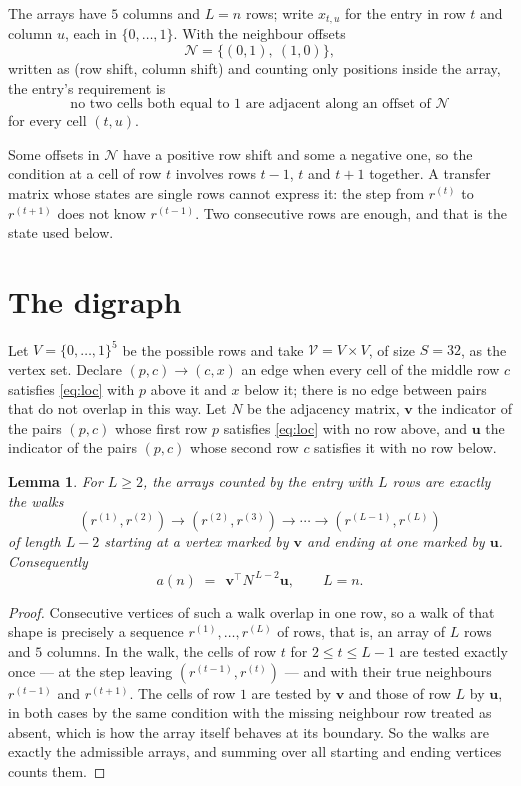 \documentclass[11pt,a4paper]{article}
\theoremstyle{plain}
\newtheorem{lemma}[theorem]{Lemma}
\theoremstyle{definition}
\begin{document}
The arrays have $5$ columns and $L=n$ rows; write $x_{t,u}$ for the entry in
row $t$ and column $u$, each in $\{0,\dots,1\}$. With the neighbour offsets
\[
\mathcal N=\{(0,1),\ (1,0)\},
\]
written as (row shift, column shift) and counting only positions inside the array, the
entry's requirement is
\begin{equation}\label{eq:loc}
\text{no two cells both equal to }1\text{ are adjacent along an offset of }\mathcal N
\end{equation}
for every cell $(t,u)$.

Some offsets in $\mathcal N$ have a positive row shift and some a negative one, so the
condition at a cell of row $t$ involves rows $t-1$, $t$ and $t+1$ together. A transfer
matrix whose states are single rows cannot express it: the step from $r^{(t)}$ to
$r^{(t+1)}$ does not know $r^{(t-1)}$. Two consecutive rows are enough, and that is
the state used below.

\section{The digraph}

Let $V=\{0,\dots,1\}^{5}$ be the possible rows and take
$\mathcal V=V\times V$, of size $S=32$, as the vertex set. Declare $(p,c)\to(c,x)$ an edge
when every cell of the middle row $c$ satisfies \eqref{eq:loc} with $p$ above it and $x$
below it; there is no edge between pairs that do not overlap in this way. Let $N$ be the
adjacency matrix, $\mathbf{v}$ the indicator of the pairs $(p,c)$ whose first row $p$
satisfies \eqref{eq:loc} with no row above, and $\mathbf{u}$ the indicator of
the pairs $(p,c)$ whose second row $c$ satisfies it with no row below.

\begin{lemma}\label{lem:walk}
For $L\ge2$, the arrays counted by the entry with $L$ rows are exactly the walks
\[
(r^{(1)},r^{(2)})\to(r^{(2)},r^{(3)})\to\cdots\to(r^{(L-1)},r^{(L)})
\]
of length $L-2$ starting at a vertex marked by $\mathbf{v}$ and ending at one marked by
$\mathbf{u}$. Consequently
\[
a(n)\;=\;\,\mathbf{v}^{\!\top}N^{\,L-2}\mathbf{u},\qquad L=n .
\]
\end{lemma}

\begin{proof}
Consecutive vertices of such a walk overlap in one row, so a walk of that shape is
precisely a sequence $r^{(1)},\dots,r^{(L)}$ of rows, that is, an array of $L$ rows
and $5$ columns. In the walk, the cells of row $t$ for $2\le t\le L-1$ are tested
exactly once --- at the step leaving $(r^{(t-1)},r^{(t)})$ --- and with their true
neighbours $r^{(t-1)}$ and $r^{(t+1)}$. The cells of row $1$ are tested by
$\mathbf{v}$ and those of row $L$ by $\mathbf{u}$, in both cases by the same condition
with the missing neighbour row treated as absent, which is how the array itself behaves at
its boundary. So the walks are exactly the admissible arrays, and summing over all starting
and ending vertices counts them.
\end{proof}
\end{document}

